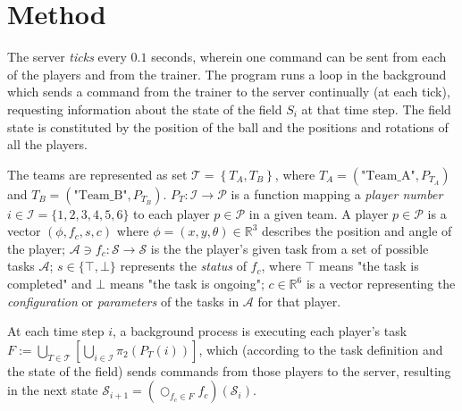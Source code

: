 \documentclass[10pt,a4paper]{article}
\begin{document}
\section{Method}

The server \textit{ticks} every \(0.1\) seconds, wherein one command can be sent from each of the players and from the trainer. The program runs a loop in the background which sends a command from the trainer to the server continually (at each tick), requesting information about the state of the field \(S_i\) at that time step. The field state is constituted by the position of the ball and the positions and rotations of all the players.

The teams are represented as set \(\mathcal{T} = \left\{ T_A, T_B \right\}\), where \(T_A = (\text{"Team\_A"}, P_{T_A})\) and \(T_B = (\text{"Team\_B"}, P_{T_B})\). \(P_T : \mathcal{I} \to \mathcal{P} \) is a function mapping a \textit{player number} \(i\in \mathcal{I} = \{1,2,3,4,5, 6\}\) to each player \(p \in \mathcal{P}\) in a given team. A player \(p\in \mathcal{P}\) is a vector \((\phi, f_c, s, c)\) where \(\phi = (x, y, \theta) \in \mathbb{R}^3\) describes the position and angle of the player; \(\mathcal{A} \ni f_c:\mathcal{S} \to \mathcal{S}\) is the the player's given task from a set of possible tasks \(\mathcal{A}\); \(s \in \{\top,\bot\}\) represents the \textit{status} of \(f_c\), where \(\top\) means "the task is completed" and \(\bot\) means "the task is ongoing"; \(c \in \mathbb{R}^6\) is a vector representing the \textit{configuration} or \textit{parameters} of the tasks in \(\mathcal{A}\) for that player.

At each time step \(i\), a background process is executing each player's task \(F := \bigcup_{T\in\mathcal{T}}\left[ \bigcup_{i\in \mathcal{I}} \pi_2(P_T(i)) \right]\), which (according to the task definition and the state of the field) sends commands from those players to the server, resulting in the next state \(\mathcal{S}_{i+1} = \left(\bigcirc_{f_c\in F} f_c\right)(\mathcal{S}_i)\).
\end{document}
